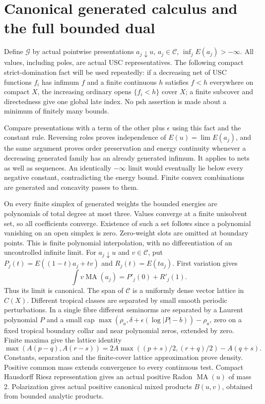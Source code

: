 \documentclass[11pt]{article}
\newcommand{\MA}{\operatorname{MA}}
\newcommand{\C}{\mathcal C}
\newcommand{\G}{\mathcal G}
\theoremstyle{remark}\newtheorem{remark}[theorem]{Remark}
\begin{document}
\section{Canonical generated calculus and the full bounded dual}
Define $\G$ by actual pointwise presentations
$a_j\downarrow u$, $a_j\in\C$, $\inf_j E(a_j)>-\infty$.
All values, including poles, are actual USC representatives. The
following compact strict-domination fact will be used repeatedly:
if a decreasing net of USC functions $f_i$ has infimum $f$ and a
finite continuous $h$ satisfies $f<h$ everywhere on compact $X$,
the increasing ordinary opens $\{f_i<h\}$ cover $X$; a finite
subcover and directedness give one global late index. No psh assertion
is made about a minimum of finitely many bounds.

Compare presentations with a term of the other plus $\epsilon$ using
this fact and the constant rule. Reversing roles proves independence
of $E(u)=\lim E(a_j)$, and the same argument proves order preservation
and energy continuity whenever a decreasing generated family has an
already generated infimum. It applies to nets as well as sequences.
An identically $-\infty$ limit would eventually lie below every negative
constant, contradicting the energy bound. Finite convex combinations
are generated and concavity passes to them.

On every finite simplex of generated weights the bounded energies are
polynomials of total degree at most three. Values converge at a finite
unisolvent set, so all coefficients converge. Existence of such a set
follows since a polynomial vanishing on an open simplex is zero.
Zero-weight slots are omitted at boundary points. This is finite
polynomial interpolation, with no differentiation of an uncontrolled
infinite limit.
For $a_j\downarrow u$ and $v\in\C$, put
$P_j(t)=E((1-t)a_j+tv)$ and $R_j(t)=E(ta_j)$. First variation gives
\[
\int v\MA(a_j)=P'_j(0)+R'_j(1).
\]
Thus its limit is canonical. The span of $\C$ is a uniformly dense
vector lattice in $C(X)$. Different tropical classes are separated by
small smooth periodic perturbations. In a single fibre different
seminorms are separated by a Laurent polynomial $P$ and a small cap
$\max(\rho_a,\delta+\epsilon(\log|P|-b))-\rho_a$, zero on a
fixed tropical boundary collar and near polynomial zeros, extended by
zero. Finite maxima give the lattice identity
\[
\max(A(p-q),A(r-s))=
2A\max((p+s)/2,(r+q)/2)-A(q+s).
\]
Constants, separation and the finite-cover lattice approximation prove
density. Positive common mass extends convergence to every continuous
test. Compact Hausdorff Riesz representation gives an actual positive
Radon $\MA(u)$ of mass 2. Polarization gives actual positive canonical
mixed products $B(u,v)$, obtained from bounded analytic products.
\end{document}
